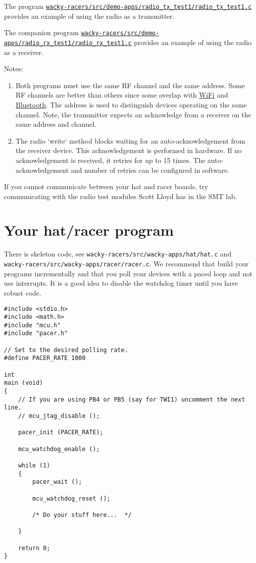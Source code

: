 The program
\href{https://eng-git.canterbury.ac.nz/mph/wacky-racers-2021/blob/master/src/demo-apps/radio_tx_test1/radio_tx_test1.c}{\texttt{wacky-racers/src/demo-apps/radio\_tx\_test1/radio\_tx\_test1.c}}
provides an example of using the radio as a transmitter.

The companion program
\href{https://eng-git.canterbury.ac.nz/mph/wacky-racers-2021/blob/master/src/demo-apps/radio_rx_test1/radio_rx_test1.c}{\texttt{wacky-racers/src/demo-apps/radio\_rx\_test1/radio\_rx\_test1.c}}
provides an example of using the radio as a receiver.

Notes:
%
\begin{enumerate}
\item
  Both programs must use the same RF channel and the same address. Some
  RF channels are better than others since some overlap with \url{WiFi}
  and \url{Bluetooth}. The address is used to distinguish devices
  operating on the same channel. Note, the transmitter expects an
  acknowledge from a receiver on the same address and channel.
\item
  The radio `write` method blocks waiting for an auto-acknowledgement
  from the receiver device. This acknowledgement is performed in
  hardware. If no acknowledgement is received, it retries for up to 15
  times. The auto-acknowledgement and number of retries can be
  configured in software.
\end{enumerate}

If you cannot communicate between your hat and racer boards, try
communicating with the radio test modules Scott Lloyd has in the SMT
lab.

\section{Your hat/racer program}
\label{your-hatracer-program}

There is skeleton code, see
\texttt{wacky-racers/src/wacky-apps/hat/hat.c} and
\texttt{wacky-racers/src/wacky-apps/racer/racer.c}. We recommend that
build your programs incrementally and that you poll your devices with a
paced loop and not use interrupts. It is a good idea to disable the
watchdog timer until you have robust code.

\begin{verbatim}
#include <stdio.h>
#include <math.h>
#include "mcu.h"
#include "pacer.h"

// Set to the desired polling rate.
#define PACER_RATE 1000

int
main (void)
{
    // If you are using PB4 or PB5 (say for TWI1) uncomment the next line.
    // mcu_jtag_disable ();    

    pacer_init (PACER_RATE);    
    
    mcu_watchdog_enable ();

    while (1)
    {
        pacer_wait ();

        mcu_watchdog_reset ();

        /* Do your stuff here...  */
        
    }
    
    return 0;
}
\end{verbatim}

